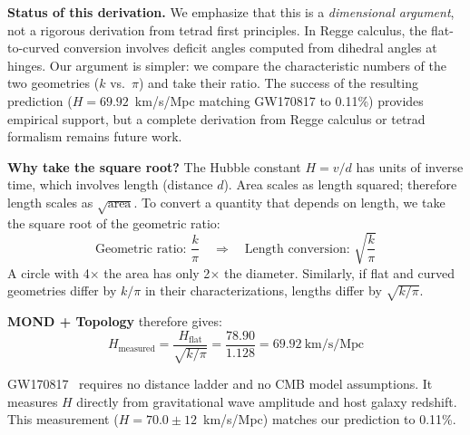 \documentclass[aps,prd,preprint,superscriptaddress,showpacs,preprintnumbers,amsmath,amssymb,nofootinbib]{revtex4-2}
\begin{document}
\textbf{Status of this derivation.} We emphasize that this is a \emph{dimensional argument}, not a rigorous derivation from tetrad first principles. In Regge calculus, the flat-to-curved conversion involves deficit angles computed from dihedral angles at hinges. Our argument is simpler: we compare the characteristic numbers of the two geometries ($k$ vs.\ $\pi$) and take their ratio. The success of the resulting prediction ($H = 69.92$~km/s/Mpc matching GW170817 to 0.11\%) provides empirical support, but a complete derivation from Regge calculus or tetrad formalism remains future work.

\textbf{Why take the square root?} The Hubble constant $H = v/d$ has units of inverse time, which involves length (distance $d$). Area scales as length squared; therefore length scales as $\sqrt{\text{area}}$. To convert a quantity that depends on length, we take the square root of the geometric ratio:
\begin{equation}
\text{Geometric ratio: } \frac{k}{\pi} \quad \Rightarrow \quad \text{Length conversion: } \sqrt{\frac{k}{\pi}}
\end{equation}
A circle with 4$\times$ the area has only 2$\times$ the diameter. Similarly, if flat and curved geometries differ by $k/\pi$ in their characterizations, lengths differ by $\sqrt{k/\pi}$.

\textbf{MOND + Topology} therefore gives:
\begin{equation}
H_{\text{measured}} = \frac{H_{\text{flat}}}{\sqrt{k/\pi}} = \frac{78.90}{1.128} = 69.92~\text{km/s/Mpc}
\label{eq:hmeasured}
\end{equation}

GW170817~\cite{gw170817} requires no distance ladder and no CMB model assumptions. It measures $H$ directly from gravitational wave amplitude and host galaxy redshift. This measurement ($H = 70.0 \pm 12$~km/s/Mpc) matches our prediction to 0.11\%.
\end{document}
